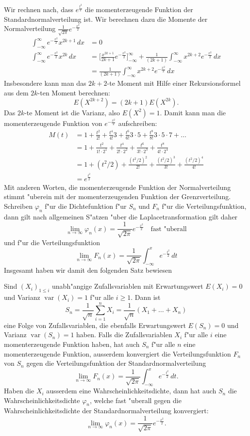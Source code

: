 Wir rechnen nach, dass $e^{\frac{t^2}2}$ die momenterzeugende Funktion
der Standardnormalverteilung ist.
Wir berechnen
dazu die Momente der Normalverteilung $\frac1{\sqrt{2\pi}}e^{-\frac{x^2}2}$
\begin{align*}
\int_{-\infty}^\infty e^{-\frac{x^2}2}x^{2k+1}\,dx&=0\\
\int_{-\infty}^\infty e^{-\frac{x^2}2}x^{2k}\,dx
&=
\biggl[\frac{x^{2k+1}}{2k+1}e^{-\frac{x^2}2}\biggr]_{-\infty}^\infty
+\frac1{(2k+1)}\int_{-\infty}^\infty x^{2k+2}e^{-\frac{x^2}2}\,dx\\
&=
\frac1{(2k+1)}\int_{-\infty}^\infty x^{2k+2}e^{-\frac{x^2}2}\,dx
\end{align*}
Insbesondere kann man das $2k+2$-te Moment mit Hilfe einer
Rekursionsformel aus dem $2k$-ten Moment berechnen:
\[
E(X^{2k+2})=(2k+1)E(X^{2k}).
\]
Das $2k$-te Moment ist die Varianz, also $E(X^2)=1$.
Damit kann
man die momenterzeugende Funktion von $e^{-\frac{x^2}2}$ aufschreiben:
\begin{align*}
M(t)
&=
1+\frac{t^2}{2!} +\frac{t^4}{4!}3 +\frac{t^6}{6!}3\cdot5 +\frac{t^8}{8!}3\cdot5\cdot7+\dots\\
&=
1+\frac{t^2}{1!\cdot 2^1} +\frac{t^4}{2! \cdot 2^2} +\frac{t^6}{3!\cdot 2^3}
+\frac{t^8}{4!\cdot 2^4}\\
&=
1+(t^2/2) +\frac{(t^2/2)^2}{2!} +\frac{(t^2/2)^3}{3!}
+\frac{(t^2/2)^4}{4!}\\
&=e^{\frac{t^2}2}
\end{align*}
Mit anderen Worten, die momenterzeugende Funktion der Normalverteilung
stimmt "uberein mit der momenterzeugenden Funktion der Grenzverteilung.
Schreiben $\varphi_n$ f"ur die Dichtefunktion f"ur $S_n$ und $F_n$
f"ur die Verteilungsfunktion, dann gilt
nach allgemeinen S"atzen "uber die Laplacetransformation gilt daher
\[
\lim_{n\to\infty}\varphi_n(x)=\frac1{\sqrt{2\pi}}e^{-\frac{x^2}2}
\quad\text{fast "uberall}
\]
und f"ur die Verteilungsfunktion
\[
\lim_{n\to\infty}F_n(x)=\frac1{\sqrt{2\pi}}\int_{-\infty}^xe^{-\frac{t^2}2}\,dt
\]
Insgesamt haben wir damit den folgenden Satz bewiesen
\begin{satz}
\label{satz-zentraler-grenzwertsatz}
Sind $(X_i)_{1\le i}$ unabh"angige Zufallsvariablen mit
Erwartungswert $E(X_i)=0$ und Varianz $\operatorname{var}(X_i)=1$
f"ur alle $i\ge 1$.
Dann ist
\[
S_n=\frac1{\sqrt{n}}\sum_{i=1}^nX_i=\frac1{\sqrt{n}}(X_1+\dots+X_n)
\]
eine Folge von Zufallsvariablen, die ebenfalls Erwartungswert $E(S_n)=0$
und Varianz $\operatorname{var}(S_n)=1$ haben.
Falls die Zufallsvariablen
$X_i$
f"ur alle $i$ eine momenterzeugende Funktion haben, hat auch $S_n$
f"ur alle $n$ eine momenterzeugende Funktion, ausserdem konvergiert
die Verteilungsfunktion $F_n$ von $S_n$ gegen die Verteilungsfunktion der
Standardnormalverteilung
\[
\lim_{n\to\infty}F_n(x)=\frac1{\sqrt{2\pi}}\int_{-\infty}^xe^{-\frac{t^2}2}\,dt.
\]
Haben die $X_i$ ausserdem eine Wahrscheinlichkeitsdichte,
dann hat auch $S_n$
die Wahrscheinlichkeitsdichte $\varphi_n$, welche fast "uberall gegen die
Wahrscheinlichkeitsdichte der Standardnormalverteilung 
konvergiert:
\[
\lim_{n\to\infty}\varphi_n(x)=\frac1{\sqrt{2\pi}}e^{-\frac{x^2}2}.
\]
\end{satz}
